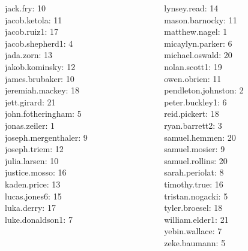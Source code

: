 \documentclass[10pt]{beamer}
\begin{document}
\begin{frame}
\begin{columns}
\begin{column}{0.33\textwidth}
jack.fry: 10 \\ 
jacob.ketola: 11 \\ 
jacob.ruiz1: 17 \\ 
jacob.shepherd1: 4 \\ 
jada.zorn: 13 \\ 
jakob.kominsky: 12 \\ 
james.brubaker: 10 \\ 
jeremiah.mackey: 18 \\ 
jett.girard: 21 \\ 
john.fotheringham: 5 \\ 
jonas.zeiler: 1 \\ 
joseph.mergenthaler: 9 \\ 
joseph.triem: 12 \\ 
julia.larsen: 10 \\ 
justice.mosso: 16 \\ 
kaden.price: 13 \\ 
lucas.jones6: 15 \\ 
luka.derry: 17 \\ 
luke.donaldson1: 7 \\\end{column}
\begin{column}{0.33\textwidth}
lynsey.read: 14 \\ 
mason.barnocky: 11 \\ 
matthew.nagel: 1 \\ 
micaylyn.parker: 6 \\ 
michael.oswald: 20 \\ 
nolan.scott1: 19 \\ 
owen.obrien: 11 \\ 
pendleton.johnston: 2 \\ 
peter.buckley1: 6 \\ 
reid.pickert: 18 \\ 
ryan.barrett2: 3 \\ 
samuel.hemmen: 20 \\ 
samuel.mosier: 9 \\ 
samuel.rollins: 20 \\ 
sarah.periolat: 8 \\ 
timothy.true: 16 \\ 
tristan.nogacki: 5 \\ 
tyler.broesel: 18 \\ 
william.elder1: 21 \\ 
yebin.wallace: 7 \\ 
zeke.baumann: 5 \\\end{column}
\end{columns}
\vfill
\end{frame}
\end{document}
